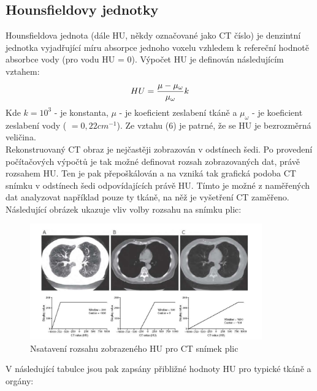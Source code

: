 \documentclass{thesis}%
\begin{document}
\subsection{Hounsfieldovy jednotky}
Hounsfieldova jednota (dále HU, někdy označované jako CT číslo) je denzintní jednotka vyjadřující míru absorpce jednoho voxelu vzhledem k refereční hodnotě absorbce vody (pro vodu HU = 0). Výpočet HU je definován následujícím vztahem:
\begin{equation}
 \centering
	HU = \frac{\mu -  \mu_{\omega}}{\mu_{\omega}}k
\end{equation}
Kde $k=10^3$ - je konstanta, $\mu$ - je koeficient zeslabení tkáně a $\mu_{\omega}$ - je koeficient zeslabení vody ( $ = 0,22cm^{-1}$). Ze vztahu (6) je patrné, že se HU je bezrozměrná veličina.\\
Rekonstruovaný CT obraz je nejčastěji zobrazován v odstínech šedi. Po provedení počítačových výpočtů je tak možné definovat rozsah zobrazovaných dat, právě rozsahem HU. Ten je pak přepoškálován a na vzniká tak grafická podoba CT snímku v odstínech šedi odpovídajících právě HU. Tímto je možné z naměřených dat analyzovat například pouze ty tkáně, na něž je vyšetření CT zaměřeno. Následující obrázek ukazuje vliv volby rozsahu na snímku plic:
\begin{figure}[ht!]
 \centering
	\includegraphics[width=10cm]{ruzna_HU.jpg}
	\caption[Nastavení rozsahu HU]{Nsatavení rozsahu zobrazeného HU pro CT snímek plic}
\end{figure}
V následující tabulce jsou pak zapsány přibližné hodnoty HU pro typické tkáně a orgány:\\
\end{document}
